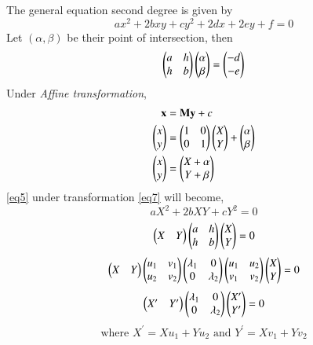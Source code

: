 \documentclass[journal,12pt,twocolumn]{IEEEtran}
\begin{document}
The general equation second degree is given by
\begin{equation}\label{eq5}
	ax^2 + 2bxy + cy^2 + 2dx + 2ey + f = 0
\end{equation}
Let $(\alpha,\beta)$ be their point of intersection, then
\begin{equation}\label{eq6}
	\begin{pmatrix} a & h\\ h & b\end{pmatrix}\begin{pmatrix}\alpha \\ \beta\end{pmatrix} = \begin{pmatrix}-d \\ -e\end{pmatrix}
\end{equation}
Under \textit{Affine transformation},
\begin{align}
	\mathbf{x} &= \mathbf{M}\mathbf{y} + c\\
	\begin{pmatrix}x \\ y\end{pmatrix} &= \begin{pmatrix}1 & 0 \\ 0 & 1\end{pmatrix} \begin{pmatrix}X \\ Y\end{pmatrix} + \begin{pmatrix}\alpha \\ \beta\end{pmatrix}\\
	\label{eq7}\begin{pmatrix}x \\ y\end{pmatrix} &= \begin{pmatrix}X+\alpha \\ Y+\beta\end{pmatrix}
\end{align}
\eqref{eq5} under transformation \eqref{eq7} will become,
\begin{equation}\label{eq8}
	aX^2 + 2bXY + cY^2 = 0
\end{equation}
\begin{equation}\label{eq9}
	\begin{pmatrix}X & Y\end{pmatrix} \begin{pmatrix}a & h \\ h & b\end{pmatrix} \begin{pmatrix}X \\ Y\end{pmatrix} = 0
\end{equation}
\begin{equation}\label{eq11}
	\begin{pmatrix}X & Y\end{pmatrix} \begin{pmatrix}u_1 & v_1 \\ u_2 & v_2\end{pmatrix} \begin{pmatrix}\lambda_1 & 0\\ 0 & \lambda_2\end{pmatrix} \begin{pmatrix}u_1 & u_2 \\ v_1 & v_2\end{pmatrix} \begin{pmatrix}X \\ Y\end{pmatrix} = 0
\end{equation}
\begin{equation}
	\begin{pmatrix}X^\prime & Y^\prime\end{pmatrix}  \begin{pmatrix}\lambda_1 & 0\\ 0 & \lambda_2\end{pmatrix} \begin{pmatrix}X^\prime \\ Y^\prime\end{pmatrix} = 0
\end{equation}
\begin{equation}\label{eq12}
	\text{where } X^\prime = Xu_1 + Yu_2 \text{ and } Y^\prime = Xv_1 + Yv_2
\end{equation}
\end{document}
